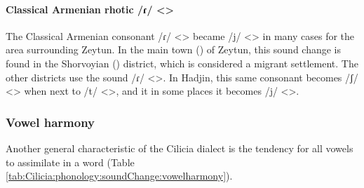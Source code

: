 \paragraph{Classical Armenian rhotic /ɾ/ <> }

The Classical Armenian consonant /ɾ/ <> became /j/ <> in many cases for the area surrounding Zeytun. In the main town () of Zeytun, this sound change is found in the Shorvoyian () district, which is considered a migrant settlement. The other districts use the sound /ɾ/ <>. In Hadjin, this same consonant becomes /ʃ/ <> when next to /t/ <>, and it in some places it becomes /j/ <>. 

\subsubsection{Vowel harmony}

Another general characteristic of the Cilicia dialect is the tendency for all vowels to assimilate in a word (Table \ref{tab:Cilicia:phonology:soundChange:vowelharmony}). 








